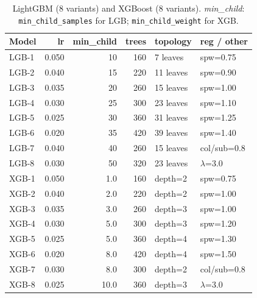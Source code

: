 \documentclass[cameraready]{Interspeech}
\begin{document}
\begin{table}[H]
\centering
\caption{LightGBM (8 variants) and XGBoost (8 variants). \textit{min\_child}: \texttt{min\_child\_samples} for LGB; \texttt{min\_child\_weight} for XGB.}
\label{tab:lgbm_specs}
\footnotesize
\begin{tabularx}{\columnwidth}{l r r r X l}
\toprule
Model & lr & min\_child & trees & topology & reg / other \\
\midrule
LGB-1 & 0.050 & 10 & 160 & 7 leaves  & spw=0.75 \\
LGB-2 & 0.040 & 15 & 220 & 11 leaves & spw=0.90 \\
LGB-3 & 0.035 & 20 & 260 & 15 leaves & spw=1.00 \\
LGB-4 & 0.030 & 25 & 300 & 23 leaves & spw=1.10 \\
LGB-5 & 0.025 & 30 & 360 & 31 leaves & spw=1.25 \\
LGB-6 & 0.020 & 35 & 420 & 39 leaves & spw=1.40 \\
LGB-7 & 0.040 & 40 & 260 & 15 leaves & col/sub=0.8 \\
LGB-8 & 0.030 & 50 & 320 & 23 leaves & $\lambda$=3.0 \\
\midrule
XGB-1 & 0.050 & 1.0  & 160 & depth=2 & spw=0.75 \\
XGB-2 & 0.040 & 2.0  & 220 & depth=2 & spw=1.00 \\
XGB-3 & 0.035 & 3.0  & 260 & depth=3 & spw=1.00 \\
XGB-4 & 0.030 & 5.0  & 300 & depth=3 & spw=1.20 \\
XGB-5 & 0.025 & 5.0  & 360 & depth=4 & spw=1.30 \\
XGB-6 & 0.020 & 8.0  & 420 & depth=4 & spw=1.50 \\
XGB-7 & 0.030 & 8.0  & 300 & depth=2 & col/sub=0.8 \\
XGB-8 & 0.025 & 10.0 & 360 & depth=3 & $\lambda$=3.0 \\
\bottomrule
\end{tabularx}
\end{table}
\end{document}
